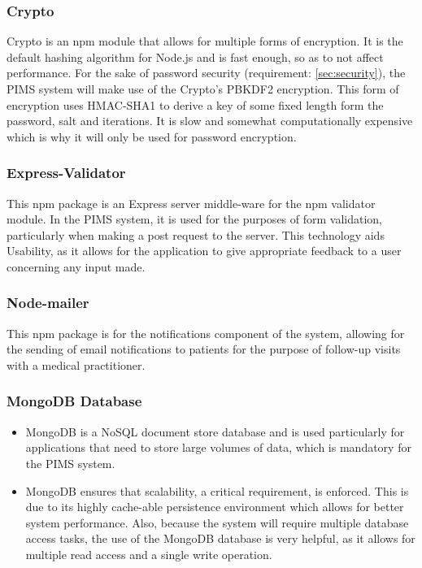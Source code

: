 \subsubsection{Crypto}
Crypto is an npm module that allows for multiple forms of encryption. It is the default hashing algorithm for Node.js and is fast enough, so as to not affect performance. For the sake of password security (requirement: \ref{sec:security}), the PIMS system will make use of the Crypto's PBKDF2 encryption. This form of encryption uses HMAC-SHA1 to derive a key of some fixed length form the password, salt and iterations. It is slow and somewhat computationally expensive which is why it will only be used for password encryption. 

\subsubsection{Express-Validator}
This npm package is an Express server middle-ware for the npm validator module. In the PIMS system, it is used for the purposes of form validation, particularly when making a post request to the server. This technology aids Usability, as it allows for the application to give appropriate feedback to a user concerning any input made.

\subsubsection{Node-mailer}
This npm package is for the notifications component of the system, allowing for the sending of email notifications to patients for the purpose of follow-up visits with a medical practitioner.
	
\subsubsection{MongoDB Database}
\begin{itemize}
	\item MongoDB is a NoSQL document store database and is used particularly for applications that need to store large volumes of data, which is mandatory for the PIMS system.
	\item MongoDB ensures that scalability, a critical requirement, is enforced. This is due to its highly cache-able persistence environment which allows for better system performance. Also, because the system will require multiple database access tasks, the use of the MongoDB database is very helpful, as it allows for multiple read access and a single write operation.
\end{itemize}
	
